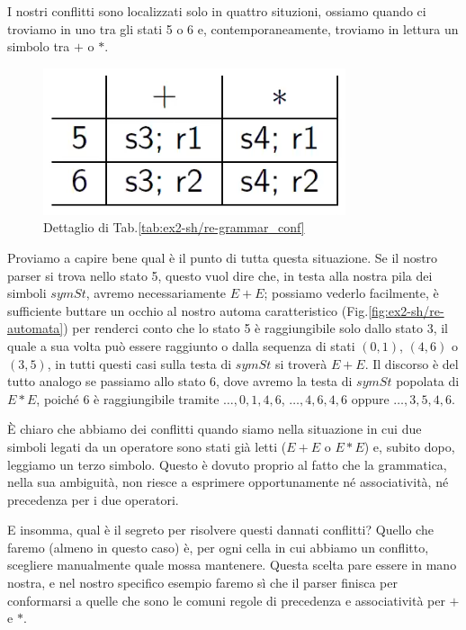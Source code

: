 \documentclass[class=book, crop=false, oneside, 12pt]{standalone}
\begin{document}
I nostri conflitti sono localizzati solo in quattro situzioni, ossiamo quando ci troviamo in uno tra gli stati 5 o 6 e, contemporaneamente, troviamo in lettura un simbolo tra \(+\) o \(\ast\).
\begin{figure}[H]
    \centering
    \includegraphics[width=.6\textwidth]{ex2-sh_re-table_conf.png}
    \caption{Dettaglio di Tab.\ref{tab:ex2-sh/re-grammar_conf}}
    \label{tab:ex2-sh/re-table_conf}
\end{figure}
\noindent Proviamo a capire bene qual è il punto di tutta questa situazione. Se il nostro parser si trova nello stato 5, questo vuol dire che, in testa alla nostra pila dei simboli \(symSt\), avremo necessariamente \(E + E\); possiamo vederlo facilmente, è sufficiente buttare un occhio al nostro automa caratteristico (Fig.\ref{fig:ex2-sh/re-automata}) per renderci conto che lo stato 5 è raggiungibile solo dallo stato \(3\), il quale a sua volta può essere raggiunto o dalla sequenza di stati \((0, 1)\), \((4, 6)\) o \((3, 5)\), in tutti questi casi sulla testa di \(symSt\) si troverà \(E + E\). Il discorso è del tutto analogo se passiamo allo stato 6, dove avremo la testa di \(symSt\) popolata di \(E * E\), poiché 6 è raggiungibile tramite \(\dots, 0, 1, 4, 6\), \(\dots, 4, 6, 4, 6\) oppure \(\dots, 3, 5, 4, 6\).

È chiaro che abbiamo dei conflitti quando siamo nella situazione in cui due simboli legati da un operatore sono stati già letti (\(E + E\) o \(E * E\)) e, subito dopo, leggiamo un terzo simbolo. Questo è dovuto proprio al fatto che la grammatica, nella sua ambiguità, non riesce a esprimere opportunamente né associatività, né precedenza per i due operatori.

E insomma, qual è il segreto per risolvere questi dannati conflitti? Quello che faremo (almeno in questo caso) è, per ogni cella in cui abbiamo un conflitto, scegliere manualmente quale mossa mantenere. Questa scelta pare essere in mano nostra, e nel nostro specifico esempio faremo sì che il parser finisca per conformarsi a quelle che sono le comuni regole di precedenza e associatività per \(+\) e \(*\). 
\end{document}
